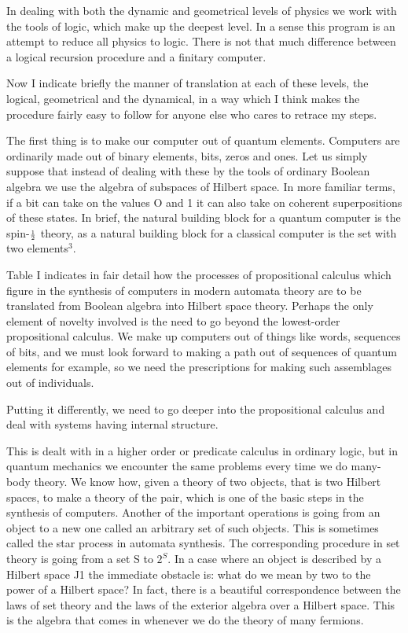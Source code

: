 In dealing with both the dynamic and geometrical levels of physics we work with
the tools of logic, which make up the deepest level. In a sense this program is
an attempt to reduce all physics to logic. There is not that much difference
between a logical recursion procedure and a finitary computer.

Now I indicate briefly the manner of translation at each of these levels, the
logical, geometrical and the dynamical, in a way which I think makes the
procedure fairly easy to follow for anyone else who cares to retrace my steps.

The first thing is to make our computer out of quantum elements. Computers are
ordinarily made out of binary elements, bits, zeros and ones. Let us simply
suppose that instead of dealing with these by the tools of ordinary Boolean
algebra we use the algebra of subspaces of Hilbert space. In more familiar terms,
if a bit can take on the values O and 1 it can also take on coherent
superpositions of these states. In brief, the natural building block for a
quantum computer is the spin-${\scriptstyle{\frac{1}{2}}}$ theory, as a natural building block for a
classical computer is the set with two elements$^3$.

Table I indicates in fair detail how the processes of propositional calculus which figure in the synthesis of computers in modern automata theory are to be translated from Boolean algebra into Hilbert space theory. Perhaps the only element of novelty involved is the need to go beyond the lowest-order propositional calculus. We make up computers out of things like words, sequences of bits, and we must look forward to making a path out of sequences of quantum elements for example, so we need the prescriptions for making such assemblages out of individuals.

Putting it differently, we need to go deeper into the propositional calculus and deal with systems having internal structure.

This is dealt with in a higher order or predicate calculus in ordinary logic, but in quantum mechanics we encounter the same problems every time we do many-body theory. We know how, given a theory of two objects, that is two Hilbert spaces, to make a theory of the pair, which is one of the basic steps in the synthesis of computers. Another of the important operations is going from an object to a new one called an arbitrary set of such objects. This is sometimes called the star process in automata synthesis.
The corresponding procedure in set theory is going from a set S to $2^S$. In a case where an object is described by a Hilbert space J1 the immediate obstacle is: what do we mean by two to the power of a Hilbert space? In fact, there is a beautiful correspondence between the laws of set theory and the laws of the exterior algebra over a Hilbert space. This is the algebra that comes in whenever we do the theory of many fermions.

